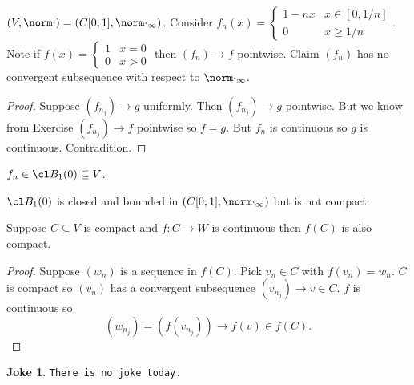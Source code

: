 \documentclass[a4paper]{article}
\theoremstyle{definition}
\newtheorem*{joke}{Joke}
\begin{document}
\begin{eg}
  \((V, \norm \cdot) = (C[0,1], \norm \cdot_\infty)\). Consider \(f_n(x) = \begin{cases} 1-nx & x\in[0,1/n] \\ 0 & x\geq 1/n \end{cases}\). Note if \(f(x) = \begin{cases} 1 & x=0 \\ 0 & x>0 \end{cases}\) then \((f_n) \to f\) pointwise. Claim \((f_n)\) has no convergent subsequence with respect to \(\norm \cdot_\infty\).

  \begin{proof}
    Suppose \((f_{n_j})\to g\) uniformly. Then \((f_{n_j})\to g\) pointwise. But we know from Exercise \((f_{n_j})\to f\) pointwise so \(f=g\). But \(f_n\) is continuous so \(g\) is continuous. Contradition.
  \end{proof}

  \begin{note}
    \(f_n\in \cl B_1(0) \subseteq V\).
  \end{note}
\end{eg}

\begin{corollary}
  \(\cl B_1(0)\) is closed and bounded in \((C[0,1], \norm \cdot_\infty)\) but is not compact.
\end{corollary}

\begin{proposition}
  Suppose \(C \subseteq V\) is compact and \(f:C\to W\) is continuous then \(f(C)\) is also compact.
\end{proposition}

\begin{proof}
  Suppose \((w_n)\) is a sequence in \(f(C)\). Pick \(v_n \in C\) with \(f(v_n) = w_n\). \(C\) is compact so \((v_n)\) has a convergent subsequence \((v_{n_j})\to v \in C\). \(f\) is continuous so
  \[
    (w_{n_j}) = (f(v_{n_j})) \to f(v) \in f(C).
  \]
\end{proof}

\begin{joke}
  \texttt{There is no joke today.}
\end{joke}
\end{document}
